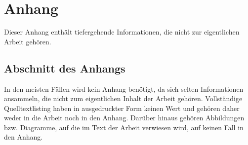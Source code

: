 
\chapter{Anhang}

Dieser Anhang enthält tiefergehende Informationen, die nicht zur eigentlichen Arbeit gehören.

\section{Abschnitt des Anhangs}

In den meisten Fällen wird kein Anhang benötigt, da sich selten Informationen ansammeln, die nicht
zum eigentlichen Inhalt der Arbeit gehören. Vollständige Quelltextlisting haben in ausgedruckter
Form keinen Wert und gehören daher weder in die Arbeit noch in den Anhang. Darüber hinaus gehören
Abbildungen bzw. Diagramme, auf die im Text der Arbeit verwiesen wird, auf keinen Fall in den Anhang.